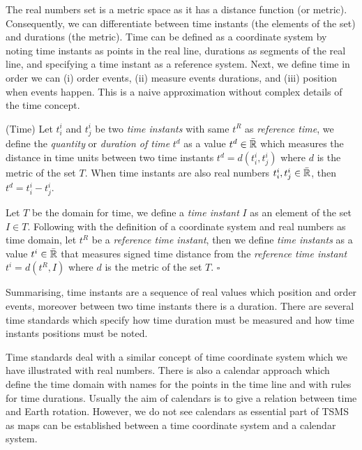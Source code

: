 The real numbers set is a metric space as it has a distance function
(or metric). Consequently, we can differentiate between time instants
(the elements of the set) and durations (the metric). Time can be
defined as a coordinate system
\cite{iep:time-supplement,kopetz11:realtime} by noting time instants
as points in the real line, durations as segments of the real line,
and specifying a time instant as a reference system. Next, we define
time in order we can (i) order events, (ii) measure events durations,
and (iii) position when events happen. This is a naive approximation
without complex details of the time concept.

\begin{definition}(Time)
  \label{def:model:temps}
  Let $t^i_i$ and $t^i_j$ be two \emph{time instants} with same $t^R$
  as \emph{reference time}, we define the \emph{quantity} or
  \emph{duration of time} $t^d$ as a value $t^d \in\bar{\mathbb{R}}$ which measures
  the distance in time units between two time instants $t^d =
  d(t^i_i,t^i_j)$ where $d$ is the metric of the set $T$. When time
  instants are also real numbers $t^i_i , t^i_j \in \bar{\mathbb{R}}$, then $t^d =
  t^i_i - t^i_j$.

  Let $T$ be the domain for time, we define a \emph{time instant} $I$
  as an element of the set $I \in T$. Following with the definition of
  a coordinate system and real numbers as time domain, let $t^{R}$ be
  a \emph{reference time instant}, then we define \emph{time instants}
  as a value $t^i \in\bar{\mathbb{R}}$ that measures signed time distance from the
  \emph{reference time instant} $t^i= d(t^{R},I)$ where $d$ is the
  metric of the set $T$. $\square$
\end{definition}

Summarising, time instants are a sequence of real values which
position and order events, moreover between two time instants there is
a duration.  There are several time standards \cite{allen:timescales}
which specify how time duration must be measured and how time instants
positions must be noted. 

Time standards deal with a similar concept of
time coordinate system which we have illustrated with real
numbers. There is also a calendar approach which define the time
domain with names for the points in the time line and with rules for
time durations. Usually the aim of calendars is to give a relation
between time and Earth rotation. However, we do not see calendars as
essential part of TSMS \cite{dreyer94} as maps can be established
between a time coordinate system and a calendar system.


